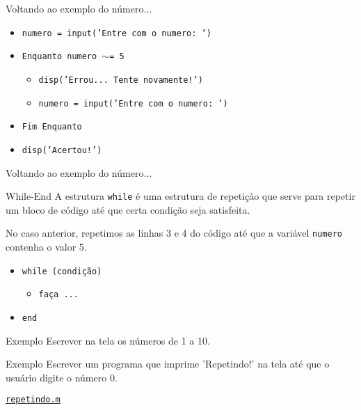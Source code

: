 \documentclass[hyperref={pdfpagelabels=false}]{beamer}
\begin{document}
\begin{frame}{Voltando ao exemplo do número...}
  \begin{itemize}
  \item[] {\texttt{numero = input('Entre com o numero: ')}}
  \item[] {\texttt{\alert{Enquanto} numero $\sim$= 5}}
    \begin{itemize}
    \item[] {\texttt{disp('Errou... Tente novamente!')}}
    \item[] {\texttt{numero = input('Entre com o numero: ')}}
    \end{itemize}
  \item[] {\texttt{\alert{Fim Enquanto}}}
  \item[] {\texttt{disp('Acertou!')}}
  \end{itemize}
\end{frame}

\begin{frame}{Voltando ao exemplo do número...}
  
\end{frame}

\begin{frame}{While-End}
  A estrutura {\texttt{while}} é uma estrutura de \alert{repetição} que serve para repetir um bloco de código até que certa condição seja satisfeita.

   No caso anterior, repetimos as linhas 3 e 4 do código até que a variável \texttt{numero} contenha o valor 5.

   \begin{itemize}
   \item[] {\texttt{while (condição)}}
     \begin{itemize}
     \item[] {\texttt{faça ...}}
     \end{itemize}
   \item[] {\texttt{end}}
   \end{itemize}
\end{frame}

\begin{frame}{Exemplo}
  Escrever na tela os números de 1 a 10.
	
\end{frame}

\begin{frame}{Exemplo}
  Escrever um programa que imprime 'Repetindo!' na tela até que o usuário digite o número 0.
	\vfill
	\begin{center} \href{listings/repetindo.m}{\underline{\texttt{repetindo.m}}} \end{center}
\end{frame}
\end{document}
